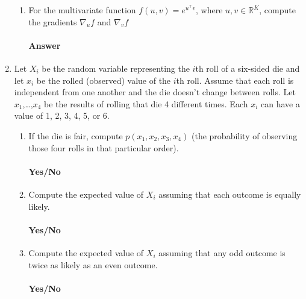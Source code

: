 \documentclass[12pt]{article}
\begin{document}
\begin{enumerate}
\begin{enumerate}
  \item For the multivariate function $f(u,v) = e^{u^{\top}v}$, where $u, v \in \mathbb{R}^K$,
        compute the gradients $\nabla_u f$ and $\nabla_v f$ \\
  \vspace{-2.5em}
  \paragraph{Answer}
  \end{enumerate}

\item Let $X_i$ be the random variable representing the $i$th roll of a six-sided die
      and let $x_i$ be the rolled (observed) value of the $i$th roll. Assume that each
      roll is independent from one another and the die doesn't change between rolls.
      Let $x_1$,\dots,$x_4$ be the results of rolling that die 4 different times. Each 
      $x_i$ can have a value of 1, 2, 3, 4, 5, or 6.
  \begin{enumerate}
  \item If the die is fair, compute $p(x_1, x_2, x_3, x_4)$ (the probability of observing
        those four rolls in that particular order).\\
  \vspace{-2.5em}
  \paragraph{Yes/No}

  \item Compute the expected value of $X_i$ assuming that each outcome is equally likely.\\
  \vspace{-2.5em}
  \paragraph{Yes/No}

  \item Compute the expected value of $X_i$ assuming that any odd outcome is twice as likely as an even outcome.\\
  \vspace{-2.5em}
  \paragraph{Yes/No}
  \end{enumerate}

\end{enumerate}
\end{document}
